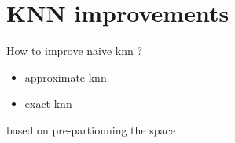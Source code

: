 \documentclass[11 pt]{beamer}
\begin{document}
\section{KNN improvements}

\begin{frame}{How to improve naive knn ?}
\begin{itemize}
	\item approximate knn
	\item exact knn
\end{itemize}

\textrightarrow based on pre-partionning the space
\end{frame}
%
\end{document}
